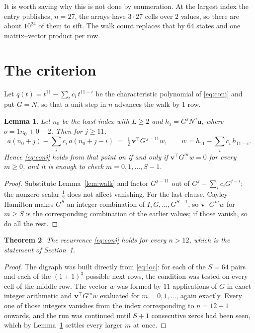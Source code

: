 \documentclass[11pt,a4paper]{article}
\theoremstyle{plain}
\newtheorem{theorem}{Theorem}
\newtheorem{lemma}[theorem]{Lemma}
\theoremstyle{definition}
\begin{document}
It is worth saying why this is not done by enumeration. At the largest index the entry
publishes, $n=27$, the arrays have $3\cdot27$ cells over
$2$ values, so there are about $10^{24}$ of them to sift. The
walk count replaces that by $64$ states and one matrix--vector product per row.
\section{The criterion}

Let $q(t)=t^{11}-\sum_i c_i\,t^{11-i}$ be the characteristic polynomial of
\eqref{eq:conj} and put $G=N$, so that a unit step in $n$ advances the walk by
$1$ row.

\begin{lemma}\label{lem:crit}
Let $n_0$ be the least index with $L\ge2$ and $h_j=G^{j}N^{o}\mathbf{u}$, where
$o=1n_0+0-2$. Then for $j\ge11$,
\[
a(n_0+j)-\sum_i c_i\,a(n_0+j-i)\;=\;\tfrac1{2}\,\mathbf{v}^{\!\top}G^{\,j-11}w,
\qquad w=h_{11}-\sum_i c_i\,h_{11-i} .
\]
Hence \eqref{eq:conj} holds from that point on if and only if
$\mathbf{v}^{\!\top}G^{m}w=0$ for every $m\ge0$, and it is enough to check
$m=0,1,\dots,S-1$.
\end{lemma}

\begin{proof}
Substitute Lemma~\ref{lem:walk} and factor $G^{j-11}$ out of
$G^{j}-\sum_ic_iG^{j-i}$; the nonzero scalar $\tfrac1{2}$ does not affect
vanishing. For the last clause, Cayley--Hamilton makes $G^{S}$ an integer combination of
$I,G,\dots,G^{S-1}$, so $\mathbf{v}^{\!\top}G^{m}w$ for $m\ge S$ is the corresponding
combination of the earlier values; if those vanish, so do all the rest.
\end{proof}

\begin{theorem}
The recurrence \eqref{eq:conj} holds for every $n>12$, which is the statement of
Section~1.
\end{theorem}

\begin{proof}
The digraph was built directly from \eqref{eq:loc}: for each of the $S=64$ pairs and each
of the $(1+1)^{3}$ possible next rows, the condition was tested on every cell of
the middle row. The vector $w$ was formed by $11$ applications of $G$ in exact integer
arithmetic and $\mathbf{v}^{\!\top}G^{m}w$ evaluated for $m=0,1,\dots$, again exactly.
Every one of those integers vanishes from the index corresponding to $n=12+1$ onwards,
and the run was continued until $S+1$ consecutive zeros had been seen, which by
Lemma~\ref{lem:crit} settles every larger $m$ at once.
\end{proof}
\end{document}
